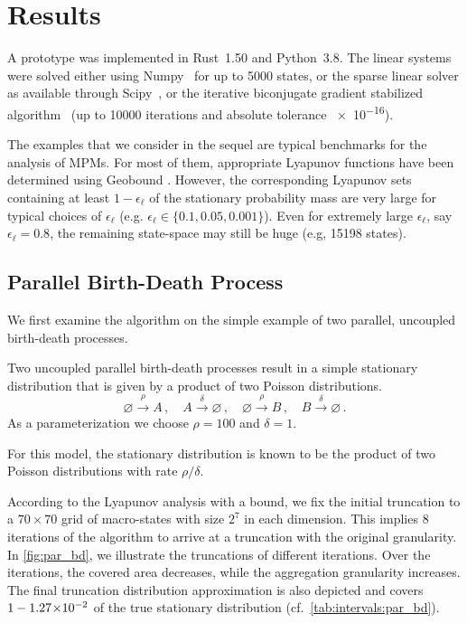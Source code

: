 \section{Results}\label{sec:statagg:results}
A prototype was implemented in Rust~1.50 and Python~3.8.
The linear systems were solved either using Numpy~\parencite{numpy} for up to \num{5000} states, or the sparse linear solver as available through Scipy~\parencite{2020SciPy-NMeth}, or the iterative biconjugate gradient stabilized algorithm~\parencite{van1992bi} (up to \num{10000} iterations and absolute tolerance \num{e-16}).

The examples that we consider in the sequel 
are typical benchmarks for the analysis of \acp{MPM}. For most of them, appropriate Lyapunov functions
have been determined using Geobound \parencite{geobound,spieler2014numerical}.
However, the corresponding Lyapunov sets containing at least $1-\epsilon_{\ell}$ of the stationary probability mass are very large for typical choices of $\epsilon_{\ell}$ (e.g. $\epsilon_{\ell}\in \{0.1,0.05,0.001\}$). Even
for extremely large $\epsilon_{\ell}$, say $\epsilon_{\ell}=0.8$, the remaining state-space may still be huge (e.g, \num{15198} states).
\subsection{Parallel Birth-Death Process}
We first examine the algorithm on the simple example of two parallel, uncoupled birth-death processes.
\begin{model}\label{model:par_bd}
Two uncoupled parallel birth-death processes result in a simple stationary distribution that is
given by a product of two Poisson distributions.
    \[
        \varnothing\xrightarrow{\rho} A \,,\quad A\xrightarrow{\delta} \varnothing \,,\quad
    \varnothing\xrightarrow{\rho} B \,,\quad B\xrightarrow{\delta} \varnothing\,.\]
As a parameterization we choose $\rho = 100$ and $\delta=1$.
\end{model}
For this model, the stationary distribution is known to be the product of two Poisson distributions with rate $\rho / \delta$.

According to the Lyapunov analysis with a  bound, we fix the initial truncation to a $70\times 70$ grid of macro-states with size $2^7$ in each dimension.
This implies 8 iterations of the algorithm to arrive at a truncation with the original granularity.
In \autoref{fig:par_bd}, we illustrate the truncations of different iterations.
Over the iterations, the covered area decreases, while the aggregation granularity increases.
The final truncation distribution approximation is also depicted and covers $1 -  1.27\!\times\hspace{-.5ex} 10^{-2} $ of the true stationary distribution (cf.\ \autoref{tab:intervals:par_bd}).

